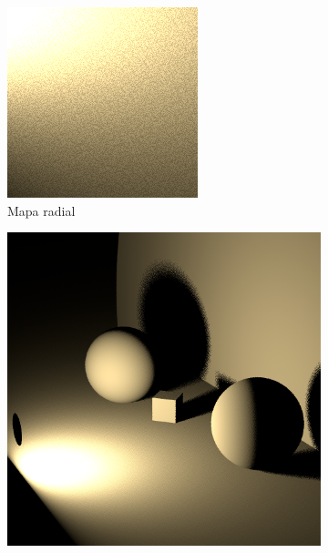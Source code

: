\begin{figure}[h!]
{\begin{minipage}{\dimexpr .33\textwidth-\fboxsep-2\fboxrule}
\begin{subfigure}{\textwidth}
            \includegraphics[width=\textwidth]{imagenes/rect92}
            \caption{Mapa radial}
            \end{subfigure}%
  \end{minipage}
  \begin{minipage}{\dimexpr .33\textwidth-\fboxsep-2\fboxrule}
   \begin{subfigure}{\textwidth}
            \centering
            \includegraphics[width=\textwidth]{imagenes/rect10}
            \vspace{0.2cm}


\end{subfigure}
\end{minipage}}
\end{figure}
